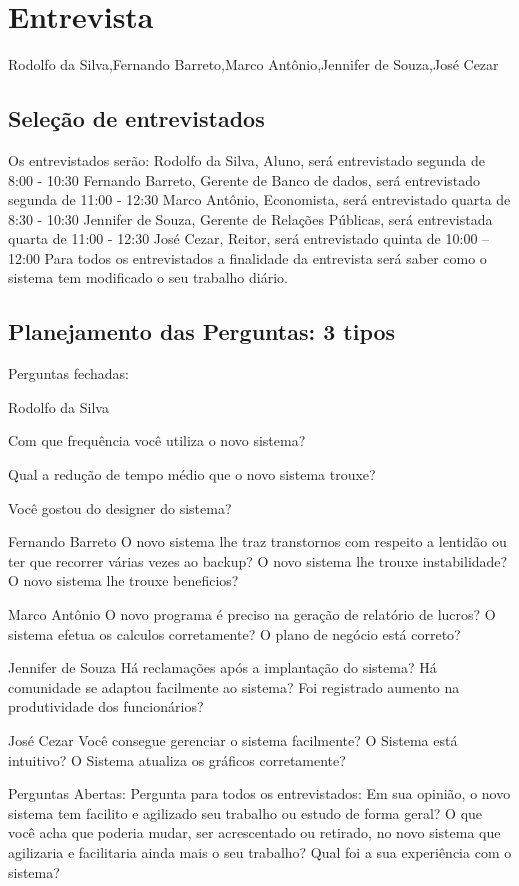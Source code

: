                
\section{Entrevista}
Rodolfo da Silva,Fernando Barreto,Marco Antônio,Jennifer de Souza,José Cezar
  \subsection{Seleção de entrevistados}
  Os entrevistados serão:
Rodolfo da Silva, Aluno, será entrevistado segunda de 8:00 - 10:30
Fernando Barreto, Gerente de Banco de dados, será entrevistado segunda de 11:00 - 12:30
Marco Antônio, Economista, será entrevistado quarta de 8:30 - 10:30
Jennifer de Souza, Gerente de Relações Públicas, será entrevistada quarta de 11:00 - 12:30
José Cezar, Reitor, será entrevistado quinta de 10:00 – 12:00
Para todos os entrevistados a finalidade da entrevista será saber como o sistema tem modificado o seu trabalho diário.
 
 \subsection{Planejamento das Perguntas: 3 tipos}
 Perguntas fechadas:
 
Rodolfo da Silva

Com que frequência você utiliza o novo sistema?

Qual a redução de tempo médio que  o novo sistema trouxe?

Você gostou do designer do sistema?

Fernando Barreto
O novo sistema lhe traz transtornos com respeito a lentidão ou ter que recorrer várias vezes ao backup?
O novo sistema lhe trouxe instabilidade?
O novo sistema lhe trouxe beneficios?

Marco Antônio
O novo programa é preciso na geração de relatório de lucros?
O sistema efetua os calculos corretamente?
O plano de negócio está correto?

Jennifer de Souza
Há reclamações após a implantação do sistema?
Há comunidade se adaptou facilmente ao sistema?
Foi registrado aumento na produtividade dos funcionários?

José Cezar
Você consegue gerenciar o sistema facilmente?
O Sistema está intuitivo?
O Sistema atualiza os gráficos corretamente?



Perguntas Abertas:
Pergunta para todos os entrevistados:
Em sua opinião, o novo sistema tem facilito e agilizado seu trabalho ou estudo de forma geral?
O que você acha que poderia mudar, ser acrescentado ou retirado, no novo sistema que agilizaria e facilitaria ainda mais o seu trabalho?
Qual foi a sua experiência com o sistema?

